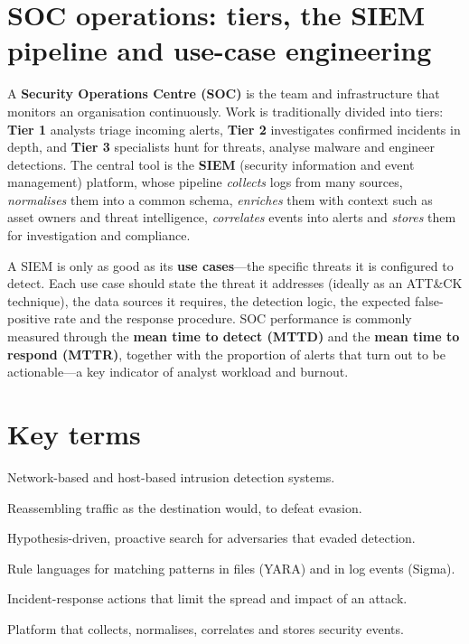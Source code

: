 \documentclass[11pt,openany]{book}
\begin{document}
\section{SOC operations: tiers, the SIEM pipeline and use-case engineering}\label{sec:11.7}
A \textbf{Security Operations Centre (SOC)} is the team and infrastructure that monitors an organisation continuously. Work is traditionally divided into tiers: \textbf{Tier 1} analysts triage incoming alerts, \textbf{Tier 2} investigates confirmed incidents in depth, and \textbf{Tier 3} specialists hunt for threats, analyse malware and engineer detections. The central tool is the \textbf{SIEM} (security information and event management) platform, whose pipeline \emph{collects} logs from many sources, \emph{normalises} them into a common schema, \emph{enriches} them with context such as asset owners and threat intelligence, \emph{correlates} events into alerts and \emph{stores} them for investigation and compliance.

A SIEM is only as good as its \textbf{use cases}—the specific threats it is configured to detect. Each use case should state the threat it addresses (ideally as an ATT\&CK technique), the data sources it requires, the detection logic, the expected false-positive rate and the response procedure. SOC performance is commonly measured through the \textbf{mean time to detect (MTTD)} and the \textbf{mean time to respond (MTTR)}, together with the proportion of alerts that turn out to be actionable—a key indicator of analyst workload and burnout.

\section*{Key terms}
\begin{description}[style=nextline,leftmargin=1.2em]
  \item[NIDS / HIDS] Network-based and host-based intrusion detection systems.
  \item[Traffic normalisation] Reassembling traffic as the destination would, to defeat evasion.
  \item[Threat hunting] Hypothesis-driven, proactive search for adversaries that evaded detection.
  \item[YARA / Sigma] Rule languages for matching patterns in files (YARA) and in log events (Sigma).
  \item[Containment] Incident-response actions that limit the spread and impact of an attack.
  \item[SIEM] Platform that collects, normalises, correlates and stores security events.
\end{description}
\end{document}
